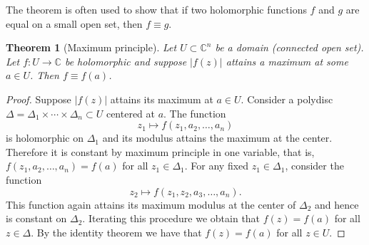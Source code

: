 \documentclass[12pt,openany]{book}
\newcommand{\sabs}[1]{\lvert {#1} \rvert}
\newcommand{\C}{{\mathbb{C}}}
\theoremstyle{plain}
\newtheorem{thm}{Theorem}[section]
\theoremstyle{remark}
\theoremstyle{definition}
\theoremstyle{exercise}
\theoremstyle{example}
\begin{document}
The theorem is often used to show that 
if two holomorphic functions $f$ and $g$ 
are equal on a small open set,
then $f \equiv g$.

\begin{thm}[Maximum principle]
Let $U \subset \C^n$ be a domain (connected open set).
Let $f \colon U \to \C$ be holomorphic and suppose $\sabs{f(z)}$
attains a maximum at some $a \in U$.  Then $f \equiv f(a)$.
\end{thm}

\begin{proof}
Suppose $\sabs{f(z)}$ attains its maximum at $a \in U$.  Consider a polydisc
$\Delta = \Delta_1 \times \cdots \times \Delta_n \subset U$
centered at $a$.  The function
\begin{equation*}
z_1 \mapsto f(z_1,a_2,\ldots,a_n) 
\end{equation*}
is holomorphic
on $\Delta_1$ and its modulus attains the maximum
at the center.  Therefore it is constant by maximum principle in one variable,
that is, $f(z_1,a_2,\ldots,a_n)  = f(a)$ for all $z_1 \in \Delta_1$.  For
any fixed $z_1
\in \Delta_1$, consider the function
\begin{equation*}
z_2 \mapsto f(z_1,z_2,a_3,\ldots,a_n)  .
\end{equation*}
This function again attains its maximum modulus at the center of $\Delta_2$
and hence is constant on $\Delta_2$.  Iterating this procedure we obtain
that $f(z) = f(a)$ for all $z \in \Delta$.  By the identity theorem we have
that $f(z) = f(a)$ for all $z \in U$.
\end{proof}
\end{document}
